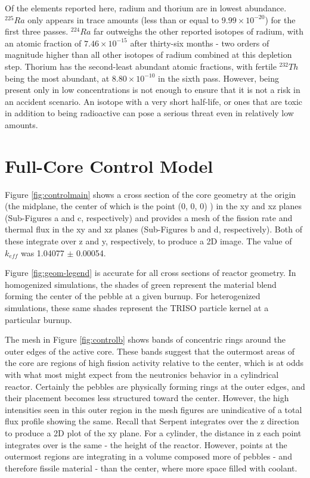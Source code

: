 Of the elements reported here, radium and thorium are in lowest abundance.  $^{225}Ra$ only appears in trace amounts (less than or equal to $9.99\times10^{-20}$) for the first three passes.  $^{224}Ra$ far outweighs the other reported isotopes of radium, with an atomic fraction of $7.46\times10^{-15}$ after thirty-six months - two orders of magnitude higher than all other isotopes of radium combined at this depletion step.  Thorium has the second-least abundant atomic fractions, with fertile $^{232}Th$ being the most abundant, at $8.80\times10^{-10}$ in the sixth pass.  However, being present only in low concentrations is not enough to ensure that it is not a risk in an accident scenario.  An isotope with a very short half-life, or ones that are toxic in addition to being radioactive can pose a serious threat even in relatively low amounts.

\section{Full-Core Control Model}
\label{res-control}

Figure \ref{fig:controlmain} shows a cross section of the core geometry at the origin (the midplane, the center of which is the point (0, 0, 0) ) in the xy and xz planes (Sub-Figures a and c, respectively) and provides a mesh of the fission rate and thermal flux in the xy and xz planes (Sub-Figures b and d, respectively).  Both of these integrate over z and y, respectively, to produce a 2D image.  The value of $k_{eff}$ was 1.04077 $\pm$ 0.00054.
%

Figure \ref{fig:geom-legend} is accurate for all cross sections of reactor geometry.  In homogenized simulations, the shades of green represent the material blend forming the center of the pebble at a given burnup.  For heterogenized simulations, these same shades represent the TRISO particle kernel at a particular burnup.



The mesh in Figure \ref{fig:controlb} shows bands of concentric rings around the outer edges of the active core.  These bands suggest that the outermost areas of the core are regions of high fission activity relative to the center, which is at odds with what most might expect from the neutronics behavior in a cylindrical reactor.  Certainly the pebbles are physically forming rings at the outer edges, and their placement becomes less structured toward the center.  However, the high intensities seen in this outer region in the mesh figures are unindicative of a total flux profile showing the same.  Recall that Serpent integrates over the z direction to produce a 2D plot of the xy plane.  For a cylinder, the distance in z each point integrates over is the same - the height of the reactor.  However, points at the outermost regions are integrating in a volume composed more of pebbles - and therefore fissile material - than the center, where more space filled with coolant.


